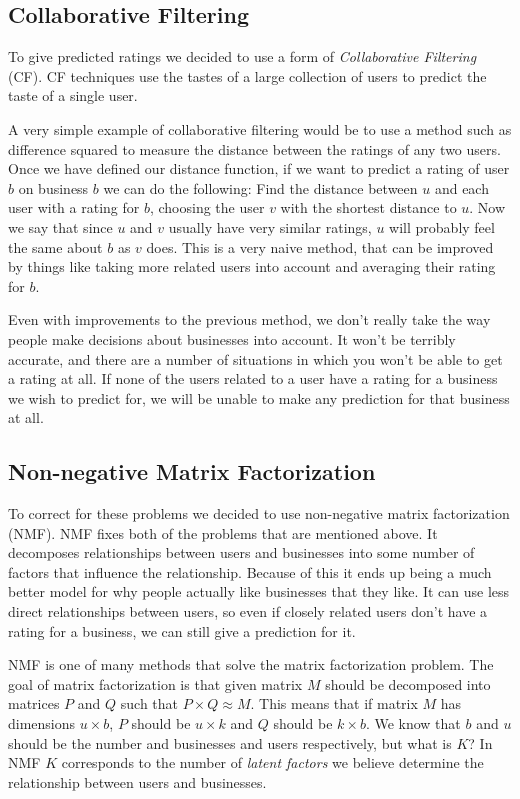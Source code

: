 \subsection{Collaborative Filtering}
To give predicted ratings we decided to use a form of \emph{Collaborative
Filtering} (CF). CF techniques use the tastes of a large collection of users to
predict the taste of a single user.

A very simple example of collaborative filtering would be to use a method such
as difference squared to measure the distance between the ratings of any two
users. Once we have defined our distance function, if we want to predict a
rating of user $b$ on business $b$ we can do the following: Find the distance
between $u$ and each user with a rating for $b$, choosing the user $v$ with the
shortest distance to $u$. Now we say that since $u$ and $v$ usually have very
similar ratings, $u$ will probably feel the same about $b$ as $v$ does. This is
a very naive method, that can be improved by things like taking more related
users into account and averaging their rating for $b$.

Even with improvements to the previous method, we don't really take the way
people make decisions about businesses into account. It won't be terribly
accurate, and there are a number of situations in which you won't be able to get
a rating at all. If none of the users related to a user have a rating for a
business we wish to predict for, we will be unable to make any prediction for
that business at all. 

\subsection{Non-negative Matrix Factorization}
To correct for these problems we decided to use non-negative matrix
factorization (NMF). NMF fixes both of the problems that are mentioned above. It
decomposes relationships between users and businesses into some number of
factors that influence the relationship. Because of this it ends up being a much
better model for why people actually like businesses that they like. It can use
less direct relationships between users, so even if closely related users don't
have a rating for a business, we can still give a prediction for it. 

NMF is one of many methods that solve the matrix factorization problem. The goal
of matrix factorization is that given matrix $M$ should be decomposed into
matrices $P$ and $Q$ such that $P \times Q \approx M $. This means that if
matrix $M$ has dimensions $u \times b$, $P$ should be $u \times k$ and $Q$
should be $k \times b$. We know that $b$ and $u$ should be the number and
businesses and users respectively, but what is $K$? In NMF $K$ corresponds to
the number of \emph{latent factors} we believe determine the relationship
between users and businesses.

